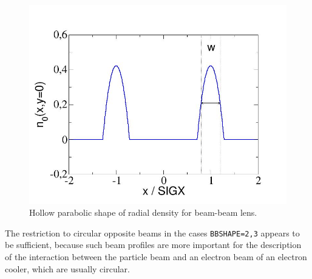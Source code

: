 \begin{madlist}
\begin{itemize}
\begin{figure}[ht]
  \centering
  \includegraphics[width=420bp]{jpg/beambeam_n_hollowparabol.jpg}
  \caption{Hollow parabolic shape of radial density for beam-beam lens.}
  \label{fig:beambeam-n-hollowparabol}
\end{figure}

     \end{itemize}

     The restriction to circular opposite beams in the cases \texttt{BBSHAPE=2,3}
     appears to be sufficient, because such beam profiles are more important
     for the description of the interaction between the particle beam and
     an electron beam of an electron cooler, which are usually circular.



\end{madlist}
